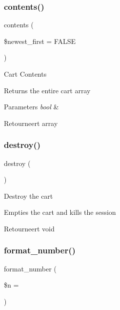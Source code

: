 \subsubsection{\texorpdfstring{contents()}{contents()}}
{\footnotesize\ttfamily contents (\begin{DoxyParamCaption}\item[{}]{\$newest\+\_\+first = {\ttfamily FALSE} }\end{DoxyParamCaption})}

Cart Contents

Returns the entire cart array


\begin{DoxyParams}{Parameters}
{\em bool} & \\
\hline
\end{DoxyParams}
\begin{DoxyReturn}{Retourneert}
array 
\end{DoxyReturn}
\mbox{\label{class_c_i___cart_aa118461de946085fe42989193337044a}} 
\subsubsection{\texorpdfstring{destroy()}{destroy()}}
{\footnotesize\ttfamily destroy (\begin{DoxyParamCaption}{ }\end{DoxyParamCaption})}

Destroy the cart

Empties the cart and kills the session

\begin{DoxyReturn}{Retourneert}
void 
\end{DoxyReturn}
\mbox{\label{class_c_i___cart_aea64eda9cf978b1e25c24458ca7e69df}} 
\subsubsection{\texorpdfstring{format\_number()}{format\_number()}}
{\footnotesize\ttfamily format\+\_\+number (\begin{DoxyParamCaption}\item[{}]{\$n = {\ttfamily \textquotesingle{}\textquotesingle{}} }\end{DoxyParamCaption})}

